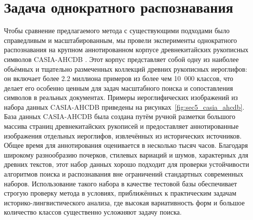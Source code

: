 
\section{Задача однократного распознавания}\label{sec:ch5/sect1}
Чтобы сравнение предлагаемого метода с существующими подходами было справедливым и масштабированным, мы провели эксперименты однократного распознавания на крупном аннотированном корпусе древнекитайских рукописных символов CASIA-AHCDB \cite{xu2019casia}. Этот корпус представляет собой одну из наиболее объёмных и тщательно размеченных коллекций древних рукописных иероглифов: он включает более 2.2 миллиона примеров из более чем 10~000 классов, что делает его особенно ценным для задач масштабного поиска и сопоставления символов в реальных документах. Примеры иероглифических изображений из набора данных CASIA-AHCDB приведены на рисунках~\cref{fig:sec5_casia_ahcdb}. База данных CASIA-AHCDB была создана путём ручной разметки большого массива страниц древнекитайских рукописей и предоставляет аннотированные изображения отдельных иероглифов, извлечённых из исторических источников. Общее время для аннотирования оценивается в несколько тысяч часов. Благодаря широкому разнообразию почерков, стилевых вариаций и шумов, характерных для древних текстов, этот набор данных хорошо подходит для проверки устойчивости алгоритмов поиска и распознавания вне ограничений стандартных современных наборов. Использование такого набора в качестве тестовой базы обеспечивает строгую проверку метода в условиях, приближённых к практическим задачам историко-лингвистического анализа, где высокая вариативность форм и большое количество классов существенно усложняют задачу поиска.


